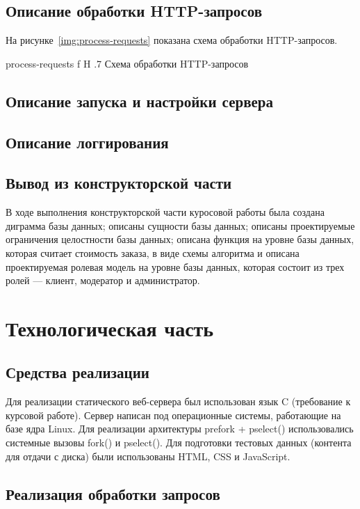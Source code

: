 \documentclass{bmstu}
\begin{document}
\section{Описание обработки HTTP-запросов}

На рисунке~\ref{img:process-requests} показана схема обработки HTTP-запросов.

    {process-requests}
    {f}
    {H}
    {.7\textwidth}
    {Схема обработки HTTP-запросов}
    
\section{Описание запуска и настройки сервера}    

\section{Описание логгирования}

\section*{Вывод из конструкторской части}

В ходе выполнения конструкторской части куросовой работы была создана диграмма базы данных; описаны сущности базы данных; описаны проектируемые ограничения целостности базы данных; описана функция на уровне базы данных, которая считает стоимость заказа, в виде схемы алгоритма и описана проектируемая ролевая модель на уровне базы данных, которая состоит из трех ролей --- клиент, модератор и администратор.

\chapter{Технологическая часть}

\section{Средства реализации}

Для реализации статического веб-сервера был использован язык C (требование к курсовой работе). 
Сервер написан под операционные системы, работающие на базе ядра Linux. 
Для реализации архитектуры prefork + pselect() использовались системные вызовы fork() и pselect(). 
Для подготовки тестовых данных (контента для отдачи с диска) были использованы HTML, CSS и JavaScript.

\section{Реализация обработки запросов}
\end{document}

